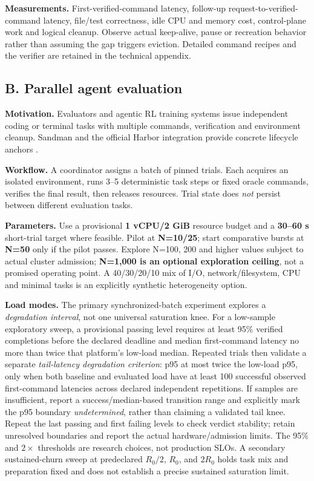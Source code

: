 \documentclass[
  a4paper,
]{article}
\begin{document}
\textbf{Measurements.} First-verified-command
latency, follow-up request-to-verified-
command latency, file/test correctness,
idle CPU and memory cost, control-plane
work and logical cleanup. Observe actual
keep-alive, pause or recreation behavior
rather than assuming the gap triggers
eviction. Detailed command recipes and
the verifier are retained in the
technical appendix.

\subsection{B. Parallel agent evaluation}
\label{scenario-b-parallel-agent-evaluation}

\textbf{Motivation.} Evaluators and
agentic RL training systems issue
independent coding or terminal tasks
with multiple commands, verification
and environment cleanup. Sandman
and the official Harbor integration
provide concrete lifecycle anchors
\cite{sandman,terminalBench,harborIntegration}.

\textbf{Workflow.} A coordinator assigns
a batch of pinned trials. Each acquires
an isolated environment, runs 3--5
deterministic task steps or fixed oracle
commands, verifies the final result,
then releases resources. Trial state
does \emph{not} persist between
different evaluation tasks.

\textbf{Parameters.} Use a provisional
\textbf{1 vCPU/2 GiB} resource budget
and a \textbf{30--60 s} short-trial
target where feasible. Pilot at
\textbf{N=10/25}; start comparative
bursts at \textbf{N=50} only if
the pilot passes. Explore N=100,
200 and higher values subject
to actual cluster admission;
\textbf{N=1,000 is an optional
exploration ceiling}, not a
promised operating point. A
40/30/20/10 mix of I/O,
network/filesystem, CPU and
minimal tasks is an explicitly
synthetic heterogeneity option.

\textbf{Load modes.} The primary
synchronized-batch experiment
explores a \emph{degradation interval},
not one universal saturation knee.
For a low-sample exploratory sweep,
a provisional passing level requires
at least 95\% verified completions
before the declared deadline and
median first-command latency no
more than twice that platform's
low-load median. Repeated trials
then validate a separate
\emph{tail-latency degradation
criterion}: p95 at most twice
the low-load p95, only when
both baseline and evaluated
load have at least 100
successful observed first-command
latencies across declared
independent repetitions.
If samples are insufficient,
report a success/median-based
transition range and explicitly
mark the p95 boundary
\emph{undetermined}, rather than
claiming a validated tail knee.
Repeat the last passing and
first failing levels to
check verdict stability;
retain unresolved boundaries
and report the actual
hardware/admission limits.
The 95\% and $2\times$
thresholds are research
choices, not production SLOs.
A secondary sustained-churn
sweep at predeclared
$R_0/2$, $R_0$, and $2R_0$
holds task mix and
preparation fixed and
does not establish a precise
sustained saturation limit.
\end{document}
